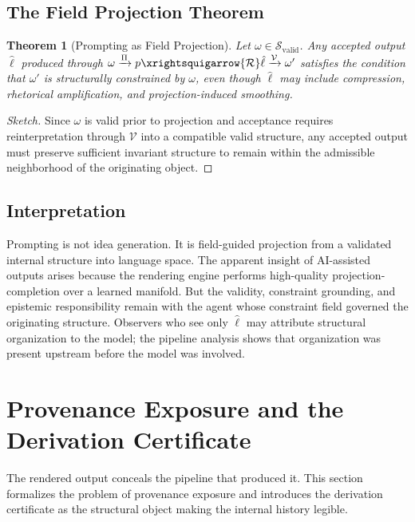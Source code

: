 \documentclass[12pt, a4paper]{article}
\theoremstyle{plain}
\newtheorem{theorem}{Theorem}[section]
\theoremstyle{definition}
\theoremstyle{remark}
\begin{document}
\subsection{The Field Projection Theorem}

\begin{theorem}[Prompting as Field Projection]
\label{thm:prompting}
Let $\omega \in \mathcal{S}_{\mathrm{valid}}$. Any accepted output $\hat{\ell}$ produced through $\omega \xrightarrow{\Pi} p \xrightsquigarrow{\mathcal{R}} \hat{\ell} \xrightarrow{\mathcal{V}} \omega'$ satisfies the condition that $\omega'$ is structurally constrained by $\omega$, even though $\hat{\ell}$ may include compression, rhetorical amplification, and projection-induced smoothing.
\end{theorem}

\begin{proof}[Sketch]
Since $\omega$ is valid prior to projection and acceptance requires reinterpretation through $\mathcal{V}$ into a compatible valid structure, any accepted output must preserve sufficient invariant structure to remain within the admissible neighborhood of the originating object.
\end{proof}

\subsection{Interpretation}

Prompting is not idea generation. It is field-guided projection from a validated internal structure into language space. The apparent insight of AI-assisted outputs arises because the rendering engine performs high-quality projection-completion over a learned manifold. But the validity, constraint grounding, and epistemic responsibility remain with the agent whose constraint field governed the originating structure. Observers who see only $\hat{\ell}$ may attribute structural organization to the model; the pipeline analysis shows that organization was present upstream before the model was involved.

\section{Provenance Exposure and the Derivation Certificate}

The rendered output conceals the pipeline that produced it. This section formalizes the problem of provenance exposure and introduces the derivation certificate as the structural object making the internal history legible.
\end{document}
